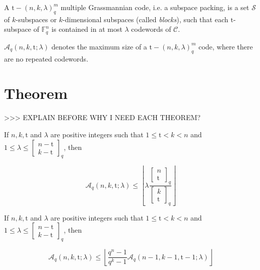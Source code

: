 \begin{defn}
 A $\mathrm{t}-\left(n,k,\lambda\right)_{q}^{m}$ multiple Grassmannian
code, i.e. a subspace packing, is a set $\mathcal{S}$ of $k$-subspaces
or $k$-dimensional subspaces (called \textit{blocks}), such that
each $\mathrm{t}$-subspace of $\ensuremath{\mathbb{F}}_{q}^{n}$
is contained in at most $\lambda$ codewords of $\mathcal{C}$. 
\end{defn}
%
\begin{defn}
$\mathcal{A}_{q}\left(n,k,\mathrm{t};\lambda\right)$ denotes the
maximum size of a $\mathrm{t}-\left(n,k,\lambda\right)_{q}^{m}$ code,
where there are no repeated codewords. 
\end{defn}

\section{Theorem}

>\textcompwordmark >\textcompwordmark > EXPLAIN BEFORE WHY I NEED
EACH THEOREM?
\begin{thm}
 If $n,k,\mathrm{t}$ and $\lambda$ are positive integers such that
$1\leq\mathrm{t}<k<n$ and $1\leq\lambda\leq\left[\begin{array}{c}
n-\mathrm{t}\\
k-\mathrm{t}
\end{array}\right]_{q}$, then

\[
\mathcal{A}_{q}\left(n,k,\mathrm{t};\lambda\right)\leq\left\lfloor \lambda\frac{\left[\begin{array}{c}
n\\
\mathrm{t}
\end{array}\right]_{q}}{\left[\begin{array}{c}
k\\
\mathrm{t}
\end{array}\right]_{q}}\right\rfloor 
\]
\end{thm}
%
\begin{thm}
 If $n,k,\mathrm{t}$ and $\lambda$ are positive integers such that
$1\leq\mathrm{t}<k<n$ and $1\leq\lambda\leq\left[\begin{array}{c}
n-\mathrm{t}\\
k-\mathrm{t}
\end{array}\right]_{q}$, then

\[
\mathcal{A}_{q}\left(n,k,\mathrm{t};\lambda\right)\leq\left\lfloor \frac{q^{n}-1}{q^{k}-1}\mathcal{A}_{q}\left(n-1,k-1,\mathrm{t}-1;\lambda\right)\right\rfloor 
\]
\end{thm}

\clearpage